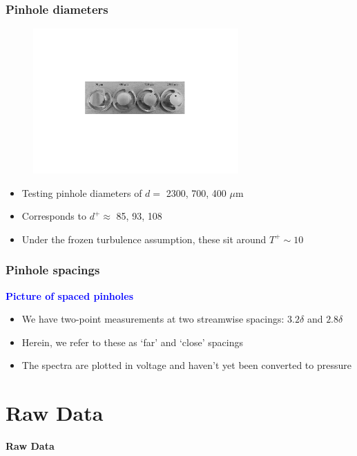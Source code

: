 \documentclass[aspectratio=169,9pt]{beamer}
\begin{document}
\begin{frame}
  \frametitle{Pinhole diameters}
  \begin{figure}
    \centering
    \includegraphics[width=0.7\textwidth]{pinholes.pdf}
  \end{figure}

  \begin{itemize}
    \centering
        \item Testing pinhole diameters of $d=$ 2300, 700, 400 $\mu$m
        \item Corresponds to $d^+ \approx$ 85, 93, 108
        \item Under the frozen turbulence assumption, these sit around $T^+\sim 10$
    \end{itemize}
\end{frame}

\begin{frame}
  \frametitle{Pinhole spacings}

  \centering
  \vspace{2cm}
  {\Huge\bfseries \textcolor{blue}{Picture of spaced pinholes}}
  \vspace{2cm}

  \begin{itemize}
    \centering
        \item We have two-point measurements at two streamwise spacings: $3.2\delta$ and $2.8\delta$
        \item Herein, we refer to these as `far' and `close' spacings
        \item The spectra are plotted in voltage and haven't yet been converted to pressure
    \end{itemize}
\end{frame}

\section{Raw Data}
\begin{frame}
  \centering
  \vfill
  {\Huge\bfseries \textcolor{cardinalred}{Raw Data}}
  \vfill
\end{frame}
\end{document}
